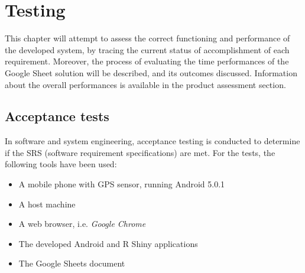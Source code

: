 \chapter{Testing}
This chapter will attempt to assess the correct functioning and performance of the developed system, by tracing the current status of accomplishment of each requirement.
Moreover, the process of evaluating the time performances of the Google Sheet solution will be described, and its outcomes discussed.
Information about the overall performances is available in the product assessment section.

\section{Acceptance tests}
In software and system engineering, acceptance testing is conducted to determine if the SRS (software requirement specifications) are met.
For the tests, the following tools have been used:
\begin{itemize}
	\setlength\itemsep{0em}
	\item A mobile phone with GPS sensor, running Android 5.0.1
	\item A host machine
	\item A web browser, i.e. \emph{Google Chrome}
	\item The developed Android and R Shiny applications
	\item The Google Sheets document
\end{itemize}



